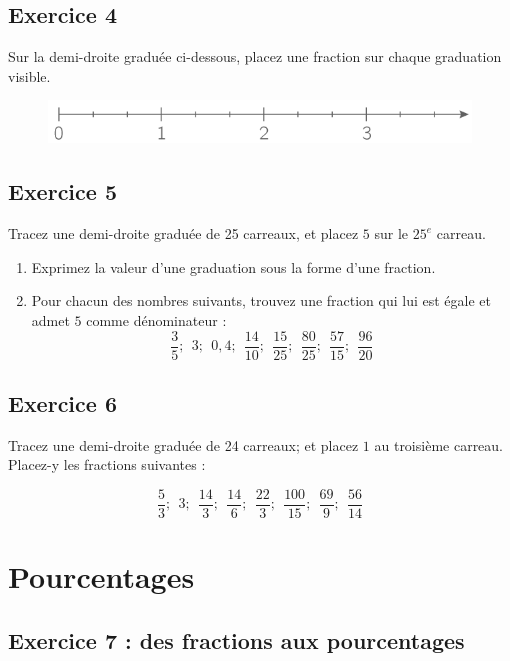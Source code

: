 \documentclass[14 pt]{extarticle}
\theoremstyle{plain}
\begin{document}
 \subsection*{Exercice 4}
 
Sur la demi-droite graduée ci-dessous, placez une fraction sur chaque graduation visible.

\begin{figure}[H]
\includegraphics[width=15cm]{Axe.png}
\end{figure} 


\subsection*{Exercice 5}

Tracez une demi-droite graduée de 25 carreaux, et placez $5$ sur le $25^e$ carreau.
\begin{enumerate}
\item Exprimez la valeur d'une graduation sous la forme d'une fraction.
\item Pour chacun des nombres suivants, trouvez une fraction qui lui est égale et admet $5$ comme dénominateur : 
\[ \frac35; \ \ 
3; \ \ 
0,4; \ \ 
\frac{14}{10}; \ \ 
\frac{15}{25}; \ \ 
\frac{80}{25}; \ \ 
\frac{57}{15}; \ \ 
\frac{96}{20}\]

\end{enumerate}
 
 \subsection*{Exercice 6}
 
 Tracez une demi-droite graduée de 24 carreaux; et placez $1$ au troisième carreau. Placez-y les fractions suivantes : 
 
\[ \frac53; \ \ 
3; \ \ 
\frac{14}3; \ \ 
\frac{14}6; \ \ 
\frac{22}3; \ \ 
\frac{100}{15}; \ \ 
\frac{69}{9}; \ \ 
\frac{56}{14}\]
\section{Pourcentages}
\subsection*{Exercice 7 : des fractions aux pourcentages}
\end{document}
